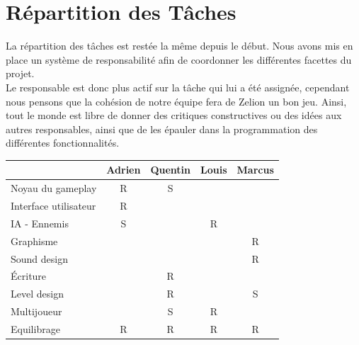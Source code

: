 \documentclass[a4page, 14pt]{extarticle}
\begin{document}
\section{Répartition des Tâches}
    {La répartition des tâches est restée la même depuis le début. Nous avons mis en place un système de responsabilité afin de coordonner les différentes facettes du projet.\\
    Le responsable est donc plus actif sur la tâche qui lui a été assignée, cependant nous pensons que la cohésion de notre équipe fera de Zelion un bon jeu. Ainsi, tout le monde est libre de donner des critiques constructives ou des idées aux autres responsables, ainsi que de les épauler dans la programmation des différentes fonctionnalités.\\}
    \begin{center}
        \begin{tabular}{|l|c|c|c|c|}
            \hline
             & Adrien & Quentin & Louis & Marcus \\
            \hline
            Noyau du gameplay & R & S & & \\
            Interface utilisateur & R & & &\\
            IA - Ennemis & S & & R & \\
            Graphisme & & & & R\\
            Sound design & & & & R\\
            Écriture & & R & & \\
            Level design & & R & & S \\
            Multijoueur & & S & R & \\
            Equilibrage & R & R& R & R \\
            \hline
        \end{tabular}
\end{center}
\end{document}
